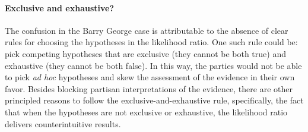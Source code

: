 \documentclass{article}
\begin{document}
 





\paragraph{Exclusive and exhaustive?}

The confusion in the Barry George case is attributable to the absence of clear rules for choosing the hypotheses in the likelihood ratio.
One such rule  could be: pick competing hypotheses that are exclusive (they cannot be both true) and exhaustive (they cannot be both false). In this way, the parties would not be able to pick  \textit{ad hoc} hypotheses and skew the assessment of the evidence in their own favor. 
%
%
Besides blocking partisan interpretations of the evidence, 
there are other principled reasons to follow the exclusive-and-exhaustive rule, specifically, 
the fact that when the hypotheses are not 
exclusive or exhaustive, 
the likelihood ratio delivers counterintuitive results.
%
%
\end{document}
